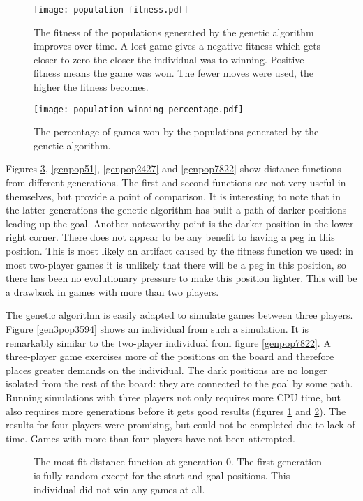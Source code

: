 \documentclass[a4paper,11pt]{article}
\begin{document}
\begin{figure}
\centering
\texttt{[image: population-fitness.pdf]}
\caption{The fitness of the populations generated by the genetic
  algorithm improves over time. A lost game gives a negative fitness
  which gets closer to zero the closer the individual was to winning.
  Positive fitness means the game was won. The fewer moves were
  used, the higher the fitness becomes.}
\label{fitness}
\end{figure}

\begin{figure}
\centering
\texttt{[image: population-winning-percentage.pdf]}
\caption{The percentage of games won by the populations generated by
  the genetic algorithm.}
\label{winning}
\end{figure}

Figures \ref{genpop0}, \ref{genpop51}, \ref{genpop2427} and
\ref{genpop7822} show distance functions from different generations.
The first and second functions are not very useful in themselves, but
provide a point of comparison. It is interesting to note that in the
latter generations the genetic algorithm has built a path of darker
positions leading up the goal. Another noteworthy point is the darker
position in the lower right corner. There does not appear to be any
benefit to having a peg in this position. This is most likely an
artifact caused by the fitness function we used: in most two-player
games it is unlikely that there will be a peg in this position, so
there has been no evolutionary pressure to make this position lighter.
This will be a drawback in games with more than two players.

The genetic algorithm is easily adapted to simulate games between
three players. Figure \ref{gen3pop3594} shows an individual from such
a simulation. It is remarkably similar to the two-player individual
from figure \ref{genpop7822}. A three-player game exercises more of
the positions on the board and therefore places greater demands on the
individual. The dark positions are no longer isolated from the rest of
the board: they are connected to the goal by some path. Running
simulations with three players not only requires more CPU time, but
also requires more generations before it gets good results (figures
\ref{fitness} and \ref{winning}). The results for four players were
promising, but could not be completed due to lack of time. Games with
more than four players have not been attempted.

\begin{figure}
\centering

\caption{The most fit distance function at generation 0. The first
  generation is fully random except for the start and goal positions.
  This individual did not win any games at all.}
\label{genpop0}
\end{figure}
\end{document}
